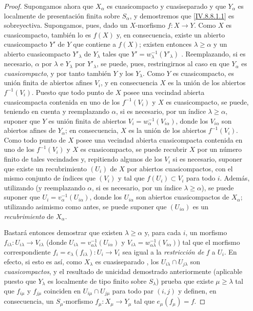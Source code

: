 \begin{proof}
Supongamos ahora que $X_\alpha$ es cuasicompacto y cuasiseparado y que $Y_\alpha$ es localmente de presentación finita sobre $S_\alpha$, y demostremos que \eqref{IV.8.8.1.1} es sobreyectiva.
Supongamos, pues, dado un $X$-morfismo $f:X\to Y$.
Como $X$ es cuasicompacto, también lo es
$f(X)$ y, en consecuencia, existe un abierto cuasicompacto $Y'$ de $Y$ que contiene a $f(X)$; existen entonces $\lambda\geq\alpha$ y un abierto cuasicompacto $Y'_\lambda$ de $Y_\lambda$ tales que $Y'=w_\lambda^{-1}(Y'_\lambda)$ .
Reemplazando, si es necesario, $\alpha$ por $\lambda$ e $Y_\lambda$ por $Y'_\lambda$, se puede, pues, restringirnos al caso en que $Y_\alpha$ es \emph{cuasicompacto}, y por tanto también $Y$ y los $Y_\lambda$.
Como $Y$ es cuasicompacto, es unión finita de abiertos afines $V_i$, y en consecuencia $X$ es la unión de los abiertos $f^{-1}(V_i)$. Puesto que todo punto de $X$ posee una vecindad abierta cuasicompacta contenida en uno de los $f^{-1}(V_i)$ y $X$ es cuasicompacto, se puede, teniendo en cuenta  y reemplazando $\alpha$, si es necesario, por un índice $\lambda\geq\alpha$, suponer que $Y$ es unión finita de abiertos $V_i=w_\alpha^{-1}(V_{i\alpha})$, donde los $V_{i\alpha}$ son abiertos afines de $Y_\alpha$; en consecuencia, $X$ es la unión de los abiertos $f^{-1}(V_i)$. Como todo punto de $X$ posee una vecindad abierta cuasicompacta contenida en uno de los $f^{-1}(V_i)$ y $X$ es cuasicompacto, se puede recubrir $X$ por un número finito de tales vecindades y, repitiendo algunos de los $V_i$ si es necesario, suponer que existe un recubrimiento $(U_i)$ de $X$ por abiertos cuasicompactos, con el mismo conjunto de índices que $(V_i)$ y tal que $f(U_i)\subset V_i$ para todo $i$. Además, utilizando  (y reemplazando $\alpha$, si es necesario, por un índice $\lambda\geq\alpha$), se puede suponer que $U_i=v_\alpha^{-1}(U_{i\alpha})$, donde los $U_{i\alpha}$ son abiertos cuasicompactos de $X_\alpha$; utilizando asimismo  como antes, se puede suponer que $(U_{i\alpha})$ es un \emph{recubrimiento} de $X_\alpha$.

Bastará entonces demostrar que existen $\lambda\geq\alpha$ y, para cada $i$, un morfismo $f_{i\lambda}:U_{i\lambda}\to V_{i\lambda}$ (donde $U_{i\lambda}=v_{\alpha\lambda}^{-1}(U_{i\alpha})$ y $V_{i\lambda}=w_{\alpha\lambda}^{-1}(V_{i\alpha})$) tal que el morfismo correspondiente $f_i=e_\lambda(f_{i\lambda}):U_i\to V_i$ sea igual a la \emph{restricción de} $f$ a $U_i$.
En efecto, si esto es así, como $X_\lambda$ es cuasiseparado , los $U_{i\lambda}\cap U_{j\lambda}$ son \emph{cuasicompactos}, y el resultado de unicidad demostrado anteriormente (aplicable puesto que $Y_\lambda$ es localmente de tipo finito sobre $S_\lambda$) prueba que existe $\mu\geq\lambda$ tal que $f_{i\mu}$ y $f_{j\mu}$ coinciden en $U_{i\mu}\cap U_{j\mu}$ para todo par $(i,j)$ y definen, en consecuencia, un $S_\mu$-morfismo $f_\mu:X_\mu\to Y_\mu$ tal que $e_\mu(f_\mu)=f$.


\end{proof}
